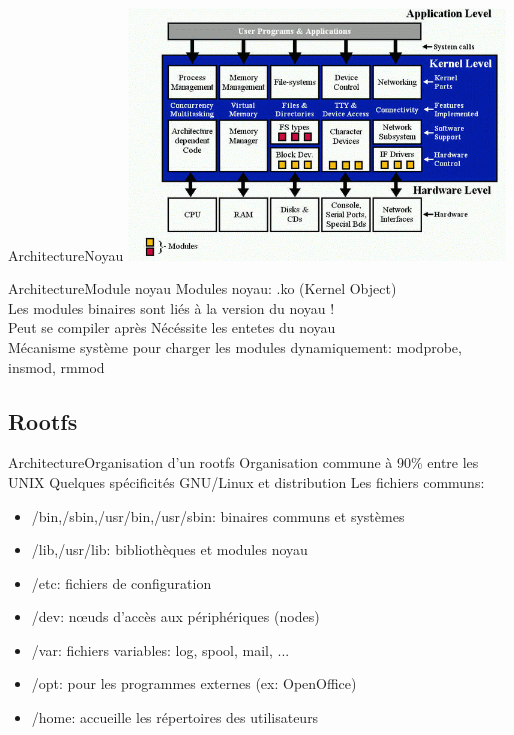 \begin{frame}{Architecture}{Noyau}
	\includegraphics[width=10cm]{kernel_arch.png}
\end{frame}

\begin{frame}{Architecture}{Module noyau}
	Modules noyau: .ko (Kernel Object)\\
	Les modules binaires sont liés à la version du noyau !\\
	Peut se compiler après Nécéssite les entetes du noyau\\
	Mécanisme système pour charger les modules dynamiquement: modprobe, insmod, rmmod
\end{frame}

\subsection{Rootfs}

\begin{frame}{Architecture}{Organisation d'un rootfs}
	Organisation commune à 90\% entre les UNIX
	Quelques spécificités GNU/Linux et distribution
	Les fichiers communs:
	\begin{itemize}
		\item
			/bin,/sbin,/usr/bin,/usr/sbin: binaires communs et systèmes
		\item
			/lib,/usr/lib: bibliothèques et modules noyau
		\item
			/etc: fichiers de configuration
		\item
			/dev: nœuds d'accès aux périphériques (nodes)
		\item
			/var: fichiers variables: log, spool, mail, ...
		\item
			/opt: pour les programmes externes (ex: OpenOffice)
		\item
			/home: accueille les répertoires des utilisateurs
	\end{itemize}
\end{frame}

